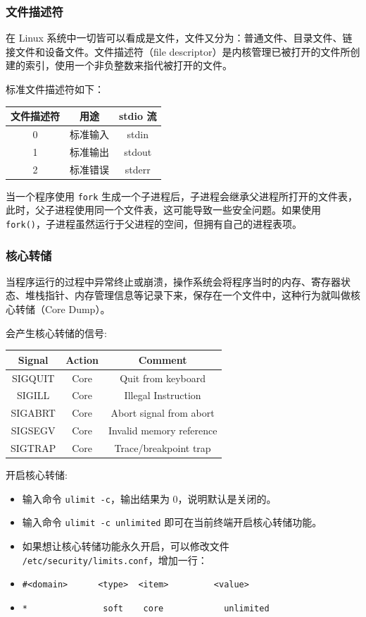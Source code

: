 \subsubsection{文件描述符}
\indent \setlength{\parindent}{2em}

\indent 在 Linux 系统中一切皆可以看成是文件，文件又分为：普通文件、目录文件、链接文件和设备文件。文件描述符（file descriptor）是内核管理已被打开的文件所创建的索引，使用一个非负整数来指代被打开的文件。

\indent 标准文件描述符如下：
\indent \\
\begin{tabular}[ht]{|c|c|c|}
    \hline
    文件描述符 & 用途 & stdio 流 \\
    \hline
    0 &	标准输入 &	stdin \\
    \hline
    1 &	标准输出 &	stdout \\
    \hline
    2 & 标准错误 &	stderr \\
    \hline
\end{tabular}

\indent 当一个程序使用 \verb+fork+ 生成一个子进程后，子进程会继承父进程所打开的文件表，此时，父子进程使用同一个文件表，这可能导致一些安全问题。如果使用 \verb+fork()+，子进程虽然运行于父进程的空间，但拥有自己的进程表项。

\subsubsection{核心转储}
\indent \setlength{\parindent}{2em}
\indent 当程序运行的过程中异常终止或崩溃，操作系统会将程序当时的内存、寄存器状态、堆栈指针、内存管理信息等记录下来，保存在一个文件中，这种行为就叫做核心转储（Core Dump）。

\indent 会产生核心转储的信号:

\begin{tabular}{|c|c|c|}
    \hline
    Signal & Action & Comment \\
    \hline
    SIGQUIT & Core & Quit from keyboard \\
    \hline
    SIGILL & Core & Illegal Instruction \\
    \hline
    SIGABRT & Core & Abort signal from abort \\
    \hline
    SIGSEGV & Core & Invalid memory reference \\
    \hline
    SIGTRAP & Core & Trace/breakpoint trap \\
    \hline
\end{tabular}

\indent 开启核心转储:
\indent \begin{itemize}
    \item 输入命令 \verb+ulimit -c+，输出结果为 0，说明默认是关闭的。
    \item 输入命令 \verb+ulimit -c unlimited+ 即可在当前终端开启核心转储功能。
    \item 如果想让核心转储功能永久开启，可以修改文件 \verb+/etc/security/limits.conf+，增加一行：
    \item \verb+#<domain>      <type>  <item>         <value>+
    \item \verb+*               soft    core            unlimited+
\end{itemize}

